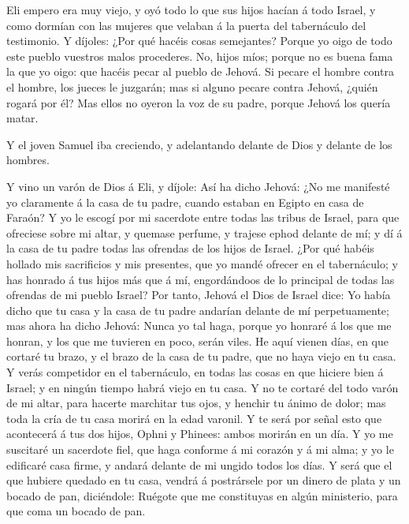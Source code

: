  Eli empero era muy viejo, y oyó todo lo que sus hijos
hacían á todo Israel, y como dormían con las mujeres que velaban á la
puerta del tabernáculo del testimonio.  Y díjoles: ¿Por qué
hacéis cosas semejantes? Porque yo oigo de todo este pueblo vuestros
malos procederes.  No, hijos míos; porque no es buena fama
la que yo oigo: que hacéis pecar al pueblo de Jehová.  Si
pecare el hombre contra el hombre, los jueces le juzgarán; mas si alguno
pecare contra Jehová, ¿quién rogará por él? Mas ellos no oyeron la voz
de su padre, porque Jehová los quería matar.

 Y el joven Samuel iba creciendo, y adelantando delante de
Dios y delante de los hombres.

 Y vino un varón de Dios á Eli, y díjole: Así ha dicho
Jehová: ¿No me manifesté yo claramente á la casa de tu padre, cuando
estaban en Egipto en casa de Faraón?  Y yo le escogí por mi
sacerdote entre todas las tribus de Israel, para que ofreciese sobre mi
altar, y quemase perfume, y trajese ephod delante de mí; y dí á la casa
de tu padre todas las ofrendas de los hijos de Israel. 
¿Por qué habéis hollado mis sacrificios y mis presentes, que yo mandé
ofrecer en el tabernáculo; y has honrado á tus hijos más que á mí,
engordándoos de lo principal de todas las ofrendas de mi pueblo Israel?
 Por tanto, Jehová el Dios de Israel dice: Yo había dicho
que tu casa y la casa de tu padre andarían delante de mí perpetuamente;
mas ahora ha dicho Jehová: Nunca yo tal haga, porque yo honraré á los
que me honran, y los que me tuvieren en poco, serán viles. 
He aquí vienen días, en que cortaré tu brazo, y el brazo de la casa de
tu padre, que no haya viejo en tu casa.  Y verás competidor
en el tabernáculo, en todas las cosas en que hiciere bien á Israel; y en
ningún tiempo habrá viejo en tu casa.  Y no te cortaré del
todo varón de mi altar, para hacerte marchitar tus ojos, y henchir tu
ánimo de dolor; mas toda la cría de tu casa morirá en la edad varonil.
 Y te será por señal esto que acontecerá á tus dos hijos,
Ophni y Phinees: ambos morirán en un día.  Y yo me
suscitaré un sacerdote fiel, que haga conforme á mi corazón y á mi alma;
y yo le edificaré casa firme, y andará delante de mi ungido todos los
días.  Y será que el que hubiere quedado en tu casa, vendrá
á postrársele por un dinero de plata y un bocado de pan, diciéndole:
Ruégote que me constituyas en algún ministerio, para que coma un bocado
de pan.

